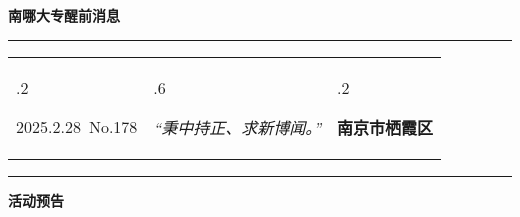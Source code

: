\documentclass[letterpaper, 12pt]{article}
\begin{document}
\begin{center}
    \Huge\textbf{南哪大专醒前消息}
\end{center}
\vspace{4mm}
\hrule
\renewcommand\tabularxcolumn[1]{m{#1}}
\begin{tabularx}{\textwidth}{>{\hsize.2\hsize}X>{\hsize.6\hsize}X>{\hsize.2\hsize}X}
    \begin{flushleft}
        2025.2.28\, No.178
    \end{flushleft}
    &
    \begin{center}
        \textit{“秉中持正、求新博闻。”}
    \end{center}
    &
    \begin{flushright}
        \textbf{南京市栖霞区}
    \end{flushright}
\end{tabularx}
\vspace{-3.5mm}
\hrule
\vspace{4mm}
\centerline{\huge\textbf{活动预告}}
\end{document}

